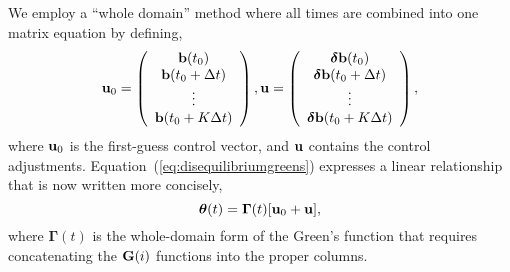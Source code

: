 \documentclass[12pt]{article}
\begin{document}
We employ a ``whole domain'' method where all times are combined into one matrix equation by defining,
\begin{equation}
  {\bf u}_0 = \left(\begin{array}{c} {\bf b}(t_0) \\ {\bf b}(t_0+{\Delta}t) \\ \vdots \\ {\bf b}(t_0+K{\Delta}t) \end{array} \right),   {\bf u} = \left(\begin{array}{c} {\boldsymbol \delta}{\bf b}(t_0) \\ {\boldsymbol \delta}{\bf b}(t_0+{\Delta}t) \\ \vdots \\ {\boldsymbol \delta}{\bf b}(t_0+K{\Delta}t) \end{array} \right),
  \end{equation}
where ${\bf u}_0$ is the first-guess control vector, and ${\bf u}$ contains the control adjustments.
Equation~(\ref{eq:disequilibriumgreens}) expresses a linear relationship that is now written more concisely,
\begin{equation}
{\boldsymbol \theta}(t) = {\boldsymbol \Gamma}(t) [{\bf u}_0 + {\bf u}],  
\end{equation}
where ${\boldsymbol \Gamma}(t)$ is the whole-domain form of the Green's function that requires concatenating the ${\bf G}(i)$ functions into the proper columns.
\end{document}
